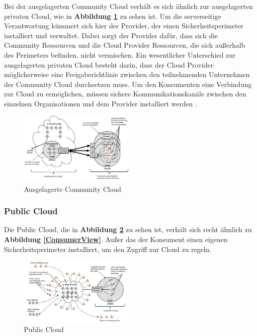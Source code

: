 Bei der ausgelagerten Community Cloud verhält es sich ähnlich zur ausgelagerten privaten Cloud, wie in \textbf{Abbildung \ref{OutSourcedCommunityCloud}} zu sehen ist.
Um die serverseitige Verantwortung kümmert sich hier der Provider, der einen Sicherheitsperimeter installiert und verwaltet. Dabei sorgt der Provider dafür, dass sich 
die Community Ressourcen und die Cloud Provider Ressourcen, die sich außerhalb des Perimeters befinden, nicht vermischen. Ein wesentlicher Unterschied zur ausgelagerten privaten Cloud
besteht darin, dass der Cloud Provider möglicherweise eine Freigaberichtlinie zwischen den teilnehmenden Unternehmen der Community Cloud durchsetzen muss. 
Um den Konsumenten eine Verbindung zur Cloud zu ermöglichen, müssen sichere Kommunikationskanäle zwischen den einzelnen Organisationen und 
dem Provider installiert werden \cite{Badger}.

\begin{figure}[h]
    \centering
	\includegraphics[width=0.5\textwidth]{Images/OutSourcedCommunityCloud}
	\caption{Ausgelagerte Community Cloud \cite{Badger}}
	\label{OutSourcedCommunityCloud}
\end{figure}

\subsubsection{Public Cloud}

Die Public Cloud, die in \textbf{Abbildung \ref{PublicCloud}} zu sehen ist, verhält sich recht ähnlich zu \textbf{Abbildung \ref{ConsumerView}}.
Außer das der Konsument einen eigenen Sicherheitsperimeter installiert, um den Zugriff zur Cloud zu regeln.

 
\begin{figure}[h]
    \centering
	\includegraphics[width=0.5\textwidth]{Images/PublicCloud}
	\caption{Public Cloud \cite{Badger}}
	\label{PublicCloud}
\end{figure}

